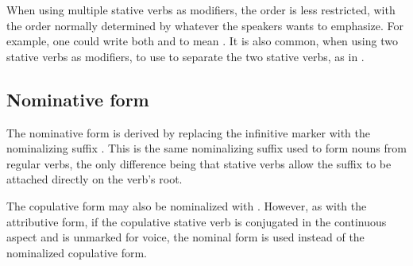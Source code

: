 When using multiple stative verbs as modifiers, the order is less restricted,
with the order normally determined by whatever the speakers wants to emphasize.
For example, one could write both  and  to mean . It is also common, when using two
stative verbs as modifiers, to use  to separate the two stative
verbs, as in .

\subsection{Nominative form}
The nominative form is derived by replacing the infinitive marker  with
the nominalizing suffix . This is the same nominalizing suffix used to
form nouns from regular verbs, the only difference being that stative verbs
allow the suffix to be attached directly on the verb's root.

The copulative form may also be nominalized with .
 However, as with the attributive form, if the copulative
stative verb is conjugated in the continuous aspect and is unmarked for voice,
the nominal form is used instead of the nominalized copulative form.